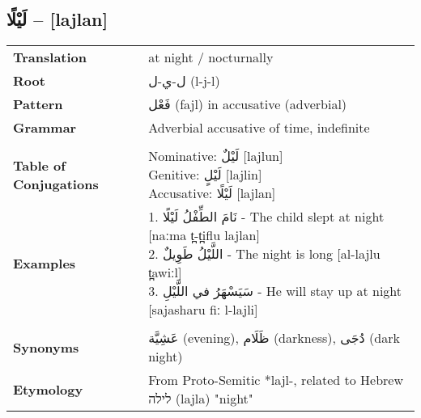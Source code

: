 \documentclass[letter,12pt]{article}
\begin{document}
\subsection{\textarabic{لَيْلًا} – [lajlan]}
\begin{tabular}{p{3cm}p{10cm}}
\toprule
\textbf{Translation} & at night / nocturnally \\
\textbf{Root} & \textarabic{ل-ي-ل} (l-j-l) \\
\textbf{Pattern} & \textarabic{فَعْل} (fajl) in accusative (adverbial) \\
\textbf{Grammar} & Adverbial accusative of time, indefinite \\
\midrule \\
\textbf{Table of Conjugations} & \makecell[l]{
Nominative: \textarabic{لَيْلٌ} [lajlun] \\
Genitive: \textarabic{لَيْلٍ} [lajlin] \\
Accusative: \textarabic{لَيْلًا} [lajlan]
} \\
\midrule
\textbf{Examples} & \makecell[l]{\parbox{9.5cm}{
1. \textarabic{نَامَ الطِّفْلُ لَيْلًا} - The child slept at night [naːma t̪-t̪iflu lajlan]\\
2. \textarabic{اللَّيْلُ طَوِيلٌ} - The night is long [al-lajlu t̪awiːl]\\
3. \textarabic{سَيَسْهَرُ في اللَّيْلِ} - He will stay up at night [sajasharu fiː l-lajli]
}} \\
\midrule \\
\textbf{Synonyms} & \textarabic{عَشِيَّة} (evening), \textarabic{ظَلَام} (darkness), \textarabic{دُجَى} (dark night) \\
\textbf{Etymology} & From Proto-Semitic *lajl-, related to Hebrew \texthebrew{לילה} (lajla) "night" \\
\bottomrule
\end{tabular}
\end{document}
